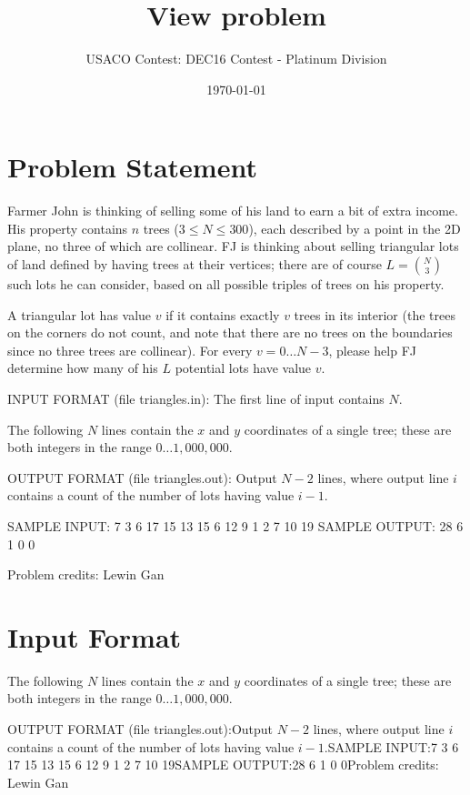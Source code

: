 \documentclass[12pt]{article}
\title{View problem}
\author{USACO Contest: DEC16 Contest - Platinum Division}
\date{\today}
\begin{document}
\maketitle

\section*{Problem Statement}

Farmer John is thinking of selling some of his land to earn a bit of extra
income.  His property contains $n$ trees ($3 \leq N \leq 300$), each described
by a point in the 2D plane, no three of which are collinear.  FJ is thinking
about selling triangular lots of land defined by having trees at their vertices;
there are of course $L = \binom{N}{3}$ such lots he can consider, based on all
possible triples of trees on his property.  

A triangular lot has value $v$ if it contains exactly $v$ trees in its interior
(the trees on the corners do not count, and note that there are no trees on the
boundaries since no three trees are collinear).  For every $v = 0 \ldots N-3$,
please help FJ determine how many of his $L$ potential lots have value $v$.

INPUT FORMAT (file triangles.in):
The first line of input contains $N$.

The following $N$ lines contain the $x$ and $y$ coordinates of a single tree;
these are both integers in the range $0 \ldots 1,000,000$.

OUTPUT FORMAT (file triangles.out):
Output $N-2$ lines, where output line $i$ contains a count of the number of lots
having value $i-1$.

SAMPLE INPUT:
7
3 6
17 15
13 15
6 12
9 1
2 7
10 19
SAMPLE OUTPUT: 
28
6
1
0
0


Problem credits: Lewin Gan



\section*{Input Format}
The following $N$ lines contain the $x$ and $y$ coordinates of a single tree;
these are both integers in the range $0 \ldots 1,000,000$.

OUTPUT FORMAT (file triangles.out):Output $N-2$ lines, where output line $i$ contains a count of the number of lots
having value $i-1$.SAMPLE INPUT:7
3 6
17 15
13 15
6 12
9 1
2 7
10 19SAMPLE OUTPUT:28
6
1
0
0Problem credits: Lewin Gan
\end{document}
